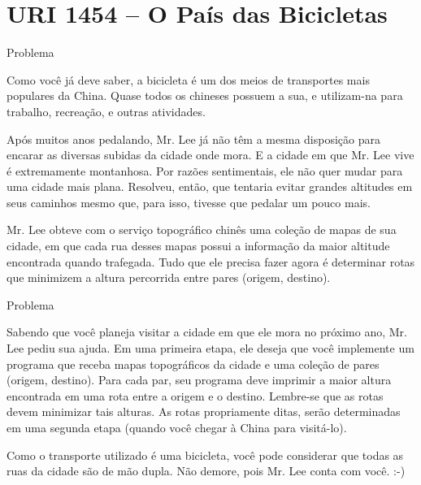 \section{URI 1454 -- O País das Bicicletas}

\begin{frame}[fragile]{Problema}

Como você já deve saber, a bicicleta é um dos meios de transportes mais populares da China. Quase todos os chineses possuem a sua, e utilizam-na para trabalho, recreação, e outras atividades.

Após muitos anos pedalando, Mr. Lee já não têm a mesma disposição para encarar as diversas subidas da cidade onde mora. E a cidade em que Mr. Lee vive é extremamente montanhosa. Por razões sentimentais, ele não quer mudar para uma cidade mais plana. Resolveu, então, que tentaria evitar grandes altitudes em seus caminhos mesmo que, para isso, tivesse que pedalar um pouco mais.

Mr. Lee obteve com o serviço topográfico chinês uma coleção de mapas de sua cidade, em que cada rua desses mapas possui a informação da maior altitude encontrada quando trafegada. Tudo que ele precisa fazer agora é determinar rotas que minimizem a altura percorrida entre pares (origem, destino).

\end{frame}

\begin{frame}[fragile]{Problema}

Sabendo que você planeja visitar a cidade em que ele mora no próximo ano, Mr. Lee pediu sua ajuda. Em uma primeira etapa, ele deseja que você implemente um programa que receba mapas topográficos da cidade e uma coleção de pares (origem, destino). Para cada par, seu programa deve imprimir a maior altura encontrada em uma rota entre a origem e o destino. Lembre-se que as rotas devem minimizar tais alturas. As rotas propriamente ditas, serão determinadas em uma segunda etapa (quando você chegar à China para visitá-lo).

Como o transporte utilizado é uma bicicleta, você pode considerar que todas as ruas da cidade são de mão dupla. Não demore, pois Mr. Lee conta com você. :-)

\end{frame}

